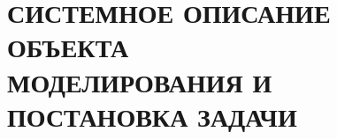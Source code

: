\section[Системное описание объекта моделирования и постановка задачи]{
  СИСТЕМНОЕ ОПИСАНИЕ ОБЪЕКТА  \\
  МОДЕЛИРОВАНИЯ И ПОСТАНОВКА ЗАДАЧИ}
\label{sec:task_analisys}
